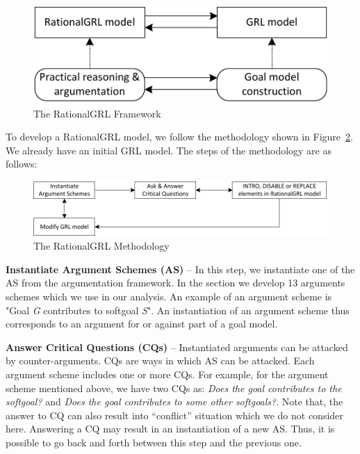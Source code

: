 \begin{figure}[ht]
\centering
\includegraphics[scale=0.4]{img/framework}
\caption{The RationalGRL Framework}
\label{fig:rationalgrl-framework}
\end{figure}

To develop a RationalGRL model, we follow the methodology shown  in Figure~\ref{fig:rationalgrl-methodology}. We already have an initial GRL model. The steps of the methodology are as follows:

\begin{figure}[ht]
\centering
\includegraphics[scale=0.4]{img/methodology}
\caption{The RationalGRL Methodology}
\label{fig:rationalgrl-methodology}
\end{figure}

\textbf{Instantiate Argument Schemes (AS)} -- In this step, we instantiate one of the AS from the argumentation framework. In the section we develop 13 arguments schemes which we use in our analysis. An example of an argument scheme is "Goal \emph{G} contributes to softgoal \emph{S}". An instantiation of an argument scheme thus corresponds to an argument for or against part of a goal model.

\textbf{Answer Critical Questions (CQs)} -- Instantiated arguments can be attacked by counter-arguments. CQs are ways in which AS can be attacked. Each argument scheme includes one or more CQs. For example, for the argument scheme mentioned above, we have two CQs as: \emph{Does the goal contributes to the softgoal?} and \emph{Does the goal contributes to some other softgoals?}. Note that, the answer to CQ can also result into ``conflict'' situation which we do not consider here. Answering a CQ may result in an instantiation of a new AS. Thus, it is possible to go back and forth between this step and the previous one.

